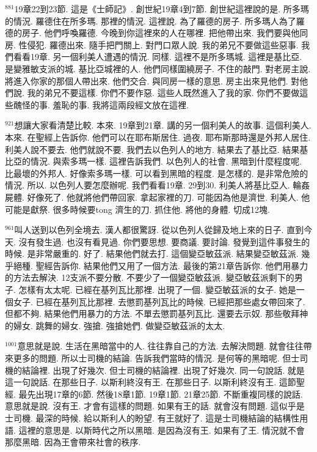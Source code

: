 \documentclass{book}
\begin{document}
$^{881}$19章22到23節.
這是《士師記》.
創世紀19章4到7節.
創世紀這裡說的是.
所多瑪的情況.
羅德住在所多瑪.
那裡的情況.
這裡說.
為了羅德的房子.
所多瑪人為了羅德的房子.
他們呼喚羅德.
今晚到你這裡來的人在哪裡.
把他帶出來.
我們要與他同房.
性侵犯.
羅德出來.
隨手把門關上.
對門口眾人說.
我的弟兄不要做這些惡事.
我們看看19章.
另一個利美人遭遇的情況.
同樣.
這裡不是所多瑪城.
這裡是基比亞.
是變雅敏支派的城.
基比亞城裡的人.
他們同樣圍繞房子.
不住的敲門.
對老房主說.
將進入你家的那個人帶出來.
他們交合.
與同房一樣的意思.
房主出來見他們.
對他們說.
我的弟兄不要這樣.
你們不要作惡.
這些人既然進入了我的家.
你們不要做這些醜怪的事.
羞恥的事.
我將這兩段經文放在這裡.

$^{921}$想讓大家看清楚比較.
本來.
19章到21章.
講的另一個利美人的故事.
這個利美人.
本來.
在聖經上告訴你.
他們可以在耶布斯居住.
過夜.
耶布斯那時還是外邦人居住.
利美人說不要去.
他們就說不要.
我們去以色列人的地方.
結果去了基比亞.
結果基比亞的情況.
與索多瑪一樣.
這裡告訴我們.
以色列人的社會.
黑暗到什麼程度呢.
比最壞的外邦人.
好像索多瑪一樣.
可以看到黑暗的程度.
是怎樣的.
是非常危險的情況.
所以.
以色列人要怎麼辦呢.
我們看看19章.
29到30.
利美人將基比亞人.
輪姦屍體.
好像死了.
他就將他們帶回家.
拿起家裡的刀.
可能因為他是濟世.
利美人.
他可能是獻祭.
很多時候要tong 濟生的刀.
抓住他.
將他的身體.
切成12塊.

$^{961}$叫人送到以色列全境去.
漢人都很驚訝.
從以色列人從歸及地上來的日子.
直到今天.
沒有發生過.
也沒有看見過.
你們要思想.
要商議.
要討論.
發覺到這件事發生的時候.
是非常嚴重的.
好了.
結果他們就去打.
這個變亞敏茲派.
結果變亞敏茲派.
幾乎絕種.
聖經告訴你.
結果他們又用了一個方法.
最後的第21章告訴你.
他們用暴力的方法去解決.
12支派不要分散.
不要少了一個變亞敏茲派.
變亞敏茲派剩下的男子.
怎樣有太太呢.
已經在基列瓦比那裡.
出現了一個.
變亞敏茲派的女子.
她是一個女子.
已經在基列瓦比那裡.
去懲罰基列瓦比的時候.
已經把那些處女帶回來了.
但都不夠.
結果他們用暴力的方法.
不單去懲罰基列瓦比.
還要去示奴.
那些敬拜神的婦女.
跳舞的婦女.
強搶.
強搶她們.
做變亞敏茲派的太太.

$^{1001}$意思就是說.
生活在黑暗當中的人.
往往靠自己的方法.
去解決問題.
就會往往帶來更多的問題.
所以士司機的結論.
告訴我們當時的情況.
是何等的黑暗呢.
但士司機的結論裡.
出現了好幾次.
但士司機的結論裡.
出現了好幾次.
同一句說話.
就是這一句說話.
在那些日子.
以斯利終沒有王.
在那些日子.
以斯利終沒有王.
這節聖經.
最先出現17章的6節.
然後18章1節.
19章1節.
21章25節.
不斷重複同樣的說話.
意思就是說.
沒有王.
才會有這樣的問題.
如果有王的話.
就會沒有問題.
這似乎是士司機.
最深的時候.
給以斯利人的盼望.
有王就好了.
這是士司機結論的結構性用語.
這裡的意思是.
以斯時代之所以黑暗.
是因為沒有王.
如果有了王.
情況就不會那麼黑暗.
因為王會帶來社會的秩序.
\end{document}
